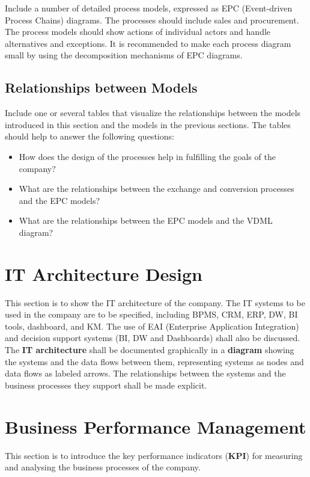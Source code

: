 \documentclass[12pt,a4paper]{article}
\begin{document}
Include a number of detailed process models, expressed as EPC (Event-driven Process Chains) diagrams.
The processes should include sales and procurement.
The process models should show actions of individual actors and handle alternatives and exceptions.
It is recommended to make each process diagram small by using the decomposition mechanisms of EPC diagrams.

\subsection{Relationships between Models}

Include one or several tables that visualize the relationships between the models introduced in this section and the models in the
previous sections.
The tables should help to answer the following questions:
\begin{itemize}
  \item How does the design of the processes help in fulfilling the goals of the company?
  \item What are the relationships between the exchange and conversion processes and the EPC models?
  \item What are the relationships between the EPC models and the VDML diagram?
\end{itemize}

\section{IT Architecture Design} \label{sec:it_architecture}

This section is to show the IT architecture of the company.
The IT systems to be used in the company are to be specified, including BPMS, CRM, ERP, DW, BI tools, dashboard, and KM.
The use of EAI (Enterprise Application Integration) and decision support systems (BI, DW and Dashboards) shall also be discussed.
The \textbf{IT architecture} shall be documented graphically in a \textbf{diagram} showing the systems and the data flows between
them, representing systems as nodes and data flows as labeled arrows.
The relationships between the systems and the business processes they support shall be made explicit.

\section{Business Performance Management} \label{sec:performance}

This section is to introduce the key performance indicators (\textbf{KPI}) for measuring and analysing the business processes of
the company.
\end{document}
